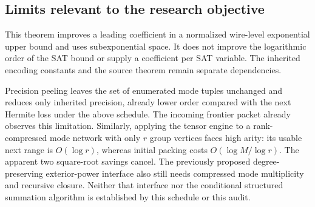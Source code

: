 \subsection{Limits relevant to the research objective}

This theorem improves a leading coefficient in a normalized wire-level
exponential upper bound and uses subexponential space. It does not improve
the logarithmic order of the SAT bound or supply a coefficient per SAT
variable. The inherited encoding constants and the source theorem remain
separate dependencies.

Precision peeling leaves the set of enumerated mode tuples unchanged and
reduces only inherited precision, already lower order compared with the
next Hermite loss under the above schedule. The incoming frontier packet
already observes this limitation. Similarly, applying the tensor engine
to a rank-compressed mode network with only $r$ group vertices faces high
arity: its usable next range is $O(\log r)$, whereas initial packing costs
$O(\log M/\log r)$. The apparent two square-root savings cancel.
The previously proposed degree-preserving exterior-power interface also
still needs compressed mode multiplicity and recursive closure. Neither
that interface nor the conditional structured summation algorithm is
established by this schedule or this audit.
